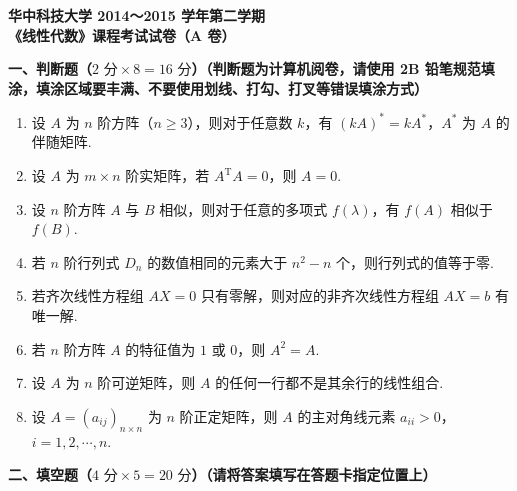 \documentclass[a4paper,11pt]{ctexart}
\newcommand{\T}{\mathrm{T}}
\begin{document}
\begin{center}
  {\Large\bfseries 华中科技大学 2014～2015 学年第二学期}\\[0.4em]
  {\Large\bfseries 《线性代数》课程考试试卷（A 卷）}
\end{center}

\vspace{0.8em}

\textbf{一、判断题（$2\text{ 分}\times 8 = 16\text{ 分}$）（判断题为计算机阅卷，请使用 2B 铅笔规范填涂，填涂区域要丰满、不要使用划线、打勾、打叉等错误填涂方式）}

\begin{enumerate}[label=\arabic*., leftmargin=2em, itemsep=0.65em, topsep=0.5em]
  \item 设 $A$ 为 $n$ 阶方阵（$n \geqslant 3$），则对于任意数 $k$，有 $(kA)^* = kA^*$，$A^*$ 为 $A$ 的伴随矩阵.

  \item 设 $A$ 为 $m \times n$ 阶实矩阵，若 $A^{\T}A = 0$，则 $A = 0$.

  \item 设 $n$ 阶方阵 $A$ 与 $B$ 相似，则对于任意的多项式 $f(\lambda)$，有 $f(A)$ 相似于 $f(B)$.

  \item 若 $n$ 阶行列式 $D_n$ 的数值相同的元素大于 $n^2 - n$ 个，则行列式的值等于零.

  \item 若齐次线性方程组 $AX = 0$ 只有零解，则对应的非齐次线性方程组 $AX = b$ 有唯一解.

  \item 若 $n$ 阶方阵 $A$ 的特征值为 $1$ 或 $0$，则 $A^2 = A$.

  \item 设 $A$ 为 $n$ 阶可逆矩阵，则 $A$ 的任何一行都不是其余行的线性组合.

  \item 设 $A = (a_{ij})_{n \times n}$ 为 $n$ 阶正定矩阵，则 $A$ 的主对角线元素 $a_{ii} > 0$，$i = 1, 2, \cdots, n$.
\end{enumerate}

\vspace{0.9em}

\textbf{二、填空题（$4\text{ 分}\times 5 = 20\text{ 分}$）（请将答案填写在答题卡指定位置上）}
\end{document}
